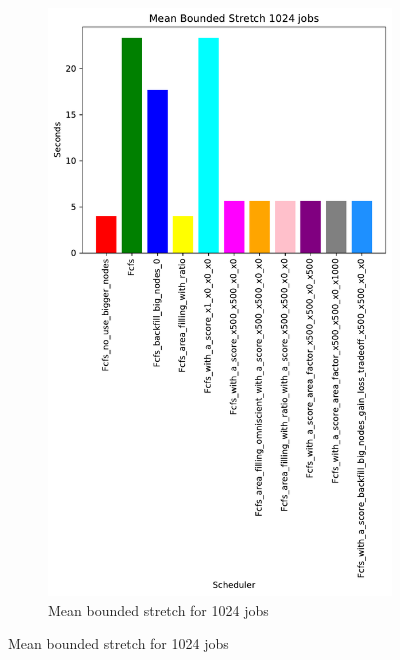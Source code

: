 \documentclass[a4paper]{article}
\begin{document}
\begin{figure}[H]
\begin{subfigure}[b]{0.4\linewidth}\centering\includegraphics[width=0.7\linewidth]{MBSS/plot/Results_Size_And_Data_2022-03-01->2022-03-03_V85105_Mean_Stretch_With_a_Minimum_1024_450_128_32_256_4_1024.pdf}\caption{Mean bounded stretch for 1024 jobs}\label{45}\end{subfigure}

\end{figure}
\end{document}
